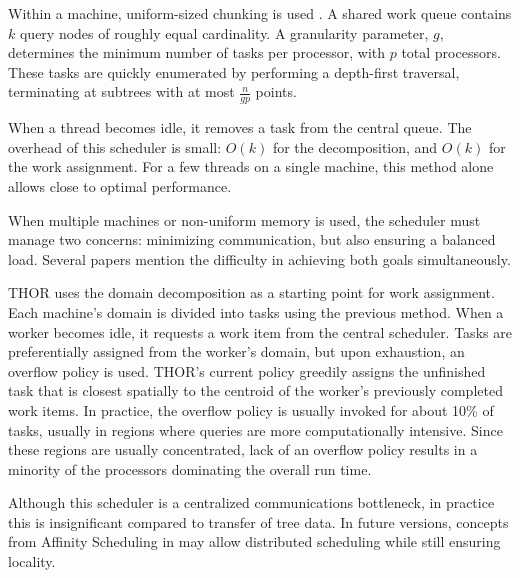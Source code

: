 \documentclass[twoside,leqno,twocolumn]{article}
\newcommand{\authornote}[1]{(\footnote{Note to self: #1})}
\newcommand{\authorsnote}[1]{\authornote{#1}}
\begin{document}

Within a machine, uniform-sized chunking is used \cite{kruskal85allocating}.
A shared work queue contains $k$ query nodes of roughly equal cardinality.
A granularity parameter, $g$, determines the minimum number of tasks per processor, with $p$ total processors.
These tasks are quickly enumerated by performing a depth-first traversal, terminating at subtrees with at most $\frac{n}{gp}$ points.

When a thread becomes idle, it removes a task from the central queue.
The overhead of this scheduler is small: $O(k)$ for the decomposition, and $O(k)$ for the work assignment.
For a few threads on a single machine, this method alone allows close to optimal performance.

When multiple machines or non-uniform memory is used, the scheduler must manage two concerns: minimizing communication, but also ensuring a balanced load.
Several papers \cite{markatos92using, salmon_thesis} mention the difficulty in achieving both goals simultaneously.

THOR uses the domain decomposition as a starting point for work assignment.
Each machine's domain is divided into tasks using the previous method.
When a worker becomes idle, it requests a work item from the central scheduler.
Tasks are preferentially assigned from the worker's domain, but upon exhaustion, an overflow policy is used.
THOR's current policy greedily assigns the unfinished task that is closest spatially to the centroid of the worker's previously completed work items.
In practice, the overflow policy is usually invoked for about 10\% of tasks, usually in regions where queries are more computationally intensive.
Since these regions are usually concentrated, lack of an overflow policy results in a minority of the processors dominating the overall run time.

Although this scheduler is a centralized communications bottleneck, in practice this is insignificant compared to transfer of tree data.
In future versions, concepts from Affinity Scheduling in \cite{markatos92using} may allow distributed scheduling while still ensuring locality.
\end{document}
